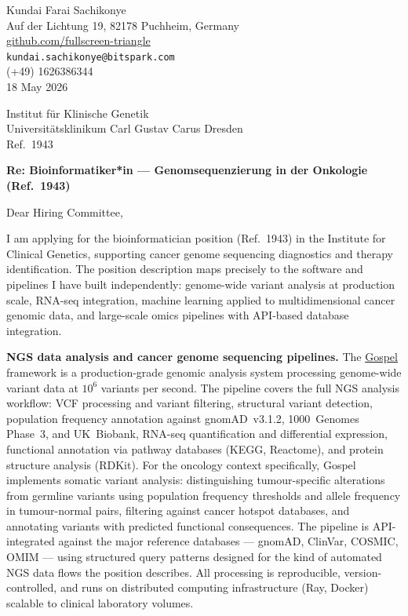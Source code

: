 \documentclass[12pt,a4paper]{article}
\begin{document}
\begin{flushright}
Kundai Farai Sachikonye \\
Auf der Lichtung 19, 82178 Puchheim, Germany \\
\href{https://github.com/fullscreen-triangle}{github.com/fullscreen-triangle} \\
\texttt{kundai.sachikonye@bitspark.com} \\
(+49) 1626386344 \\[6pt]
18 May 2026
\end{flushright}

\vspace{1em}

Institut für Klinische Genetik \\
Universitätsklinikum Carl Gustav Carus Dresden \\
Ref.\ 1943

\vspace{1.5em}

\textbf{Re: Bioinformatiker*in --- Genomsequenzierung in der Onkologie (Ref.\ 1943)}

\vspace{1em}

Dear Hiring Committee,

I am applying for the bioinformatician position (Ref.\ 1943) in the Institute
for Clinical Genetics, supporting cancer genome sequencing diagnostics and
therapy identification.
The position description maps precisely to the software and pipelines I have
built independently: genome-wide variant analysis at production scale, RNA-seq
integration, machine learning applied to multidimensional cancer genomic data,
and large-scale omics pipelines with API-based database integration.

\textbf{NGS data analysis and cancer genome sequencing pipelines.}
The \href{https://github.com/fullscreen-triangle/gospel}{Gospel} framework
is a production-grade genomic analysis system processing genome-wide variant
data at $10^6$ variants per second.
The pipeline covers the full NGS analysis workflow: VCF processing and
variant filtering, structural variant detection, population frequency
annotation against gnomAD~v3.1.2, 1000~Genomes Phase~3, and UK~Biobank,
RNA-seq quantification and differential expression, functional annotation
via pathway databases (KEGG, Reactome), and protein structure analysis (RDKit).
For the oncology context specifically, Gospel implements somatic variant
analysis: distinguishing tumour-specific alterations from germline variants
using population frequency thresholds and allele frequency in tumour-normal
pairs, filtering against cancer hotspot databases, and annotating variants
with predicted functional consequences.
The pipeline is API-integrated against the major reference databases --- gnomAD,
ClinVar, COSMIC, OMIM --- using structured query patterns designed for the
kind of automated NGS data flows the position describes.
All processing is reproducible, version-controlled, and runs on distributed
computing infrastructure (Ray, Docker) scalable to clinical laboratory volumes.
\end{document}
